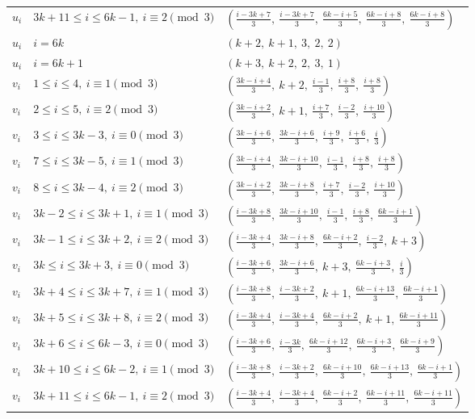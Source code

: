 \begin{longtable}{lll}
$u_i$ & $3k+11 \le i \le 6k-1,\ i \equiv 2 \pmod{3}$ & $(\frac{i-3k+7}{3},\ \frac{i-3k+7}{3},\ \frac{6k-i+5}{3},\ \frac{6k-i+8}{3},\ \frac{6k-i+8}{3})$ \\
$u_i$ & $i = 6k$ & $(k+2,\ k+1,\ 3,\ 2,\ 2)$ \\
$u_i$ & $i = 6k+1$ & $(k+3,\ k+2,\ 2,\ 3,\ 1)$ \\
$v_i$ & $1 \le i \le 4,\ i \equiv 1 \pmod{3}$ & $(\frac{3k-i+4}{3},\ k+2,\ \frac{i-1}{3},\ \frac{i+8}{3},\ \frac{i+8}{3})$ \\
$v_i$ & $2 \le i \le 5,\ i \equiv 2 \pmod{3}$ & $(\frac{3k-i+2}{3},\ k+1,\ \frac{i+7}{3},\ \frac{i-2}{3},\ \frac{i+10}{3})$ \\
$v_i$ & $3 \le i \le 3k-3,\ i \equiv 0 \pmod{3}$ & $(\frac{3k-i+6}{3},\ \frac{3k-i+6}{3},\ \frac{i+9}{3},\ \frac{i+6}{3},\ \frac{i}{3})$ \\
$v_i$ & $7 \le i \le 3k-5,\ i \equiv 1 \pmod{3}$ & $(\frac{3k-i+4}{3},\ \frac{3k-i+10}{3},\ \frac{i-1}{3},\ \frac{i+8}{3},\ \frac{i+8}{3})$ \\
$v_i$ & $8 \le i \le 3k-4,\ i \equiv 2 \pmod{3}$ & $(\frac{3k-i+2}{3},\ \frac{3k-i+8}{3},\ \frac{i+7}{3},\ \frac{i-2}{3},\ \frac{i+10}{3})$ \\
$v_i$ & $3k-2 \le i \le 3k+1,\ i \equiv 1 \pmod{3}$ & $(\frac{i-3k+8}{3},\ \frac{3k-i+10}{3},\ \frac{i-1}{3},\ \frac{i+8}{3},\ \frac{6k-i+1}{3})$ \\
$v_i$ & $3k-1 \le i \le 3k+2,\ i \equiv 2 \pmod{3}$ & $(\frac{i-3k+4}{3},\ \frac{3k-i+8}{3},\ \frac{6k-i+2}{3},\ \frac{i-2}{3},\ k+3)$ \\
$v_i$ & $3k \le i \le 3k+3,\ i \equiv 0 \pmod{3}$ & $(\frac{i-3k+6}{3},\ \frac{3k-i+6}{3},\ k+3,\ \frac{6k-i+3}{3},\ \frac{i}{3})$ \\
$v_i$ & $3k+4 \le i \le 3k+7,\ i \equiv 1 \pmod{3}$ & $(\frac{i-3k+8}{3},\ \frac{i-3k+2}{3},\ k+1,\ \frac{6k-i+13}{3},\ \frac{6k-i+1}{3})$ \\
$v_i$ & $3k+5 \le i \le 3k+8,\ i \equiv 2 \pmod{3}$ & $(\frac{i-3k+4}{3},\ \frac{i-3k+4}{3},\ \frac{6k-i+2}{3},\ k+1,\ \frac{6k-i+11}{3})$ \\
$v_i$ & $3k+6 \le i \le 6k-3,\ i \equiv 0 \pmod{3}$ & $(\frac{i-3k+6}{3},\ \frac{i-3k}{3},\ \frac{6k-i+12}{3},\ \frac{6k-i+3}{3},\ \frac{6k-i+9}{3})$ \\
$v_i$ & $3k+10 \le i \le 6k-2,\ i \equiv 1 \pmod{3}$ & $(\frac{i-3k+8}{3},\ \frac{i-3k+2}{3},\ \frac{6k-i+10}{3},\ \frac{6k-i+13}{3},\ \frac{6k-i+1}{3})$ \\
$v_i$ & $3k+11 \le i \le 6k-1,\ i \equiv 2 \pmod{3}$ & $(\frac{i-3k+4}{3},\ \frac{i-3k+4}{3},\ \frac{6k-i+2}{3},\ \frac{6k-i+11}{3},\ \frac{6k-i+11}{3})$ \\

\end{longtable}
